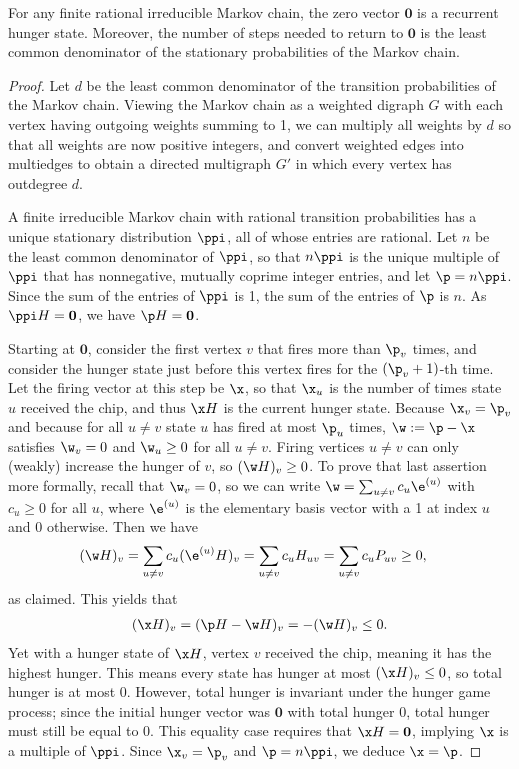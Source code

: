 \begin{proposition}\label{proposition: 0 hunger recurrent}
For any finite rational irreducible Markov chain, 
the zero vector $\mathbf{0}$ is a recurrent hunger state.
Moreover, the number of steps needed to return to $\mathbf{0}$ 
is the least common denominator of the stationary probabilities of the Markov chain.
\end{proposition}
\begin{proof}
Let $d$ be the least common denominator 
of the transition probabilities of the Markov chain.
Viewing the Markov chain as a weighted digraph $G$
with each vertex having outgoing weights summing to 1,
we can multiply all weights by $d$ so that all weights are now positive integers, 
and convert weighted edges into multiedges to obtain a directed multigraph $G'$
in which every vertex has outdegree $d$.

A finite irreducible Markov chain with rational transition probabilities
has a unique stationary distribution $\ppi$, all of whose entries are rational.
Let $n$ be the least common denominator of $\ppi$, so that $n\ppi$
is the unique multiple of $\ppi$ 
that has nonnegative, mutually coprime integer entries, and let $\p = n\ppi$.
Since the sum of the entries of $\ppi$ is 1, the sum of the entries of $\p$ is $n$. 
As $\ppi H=\mathbf{0}$, we have $\p H=\mathbf{0}$.

Starting at $\mathbf{0}$, consider the first vertex $v$ that fires more than $\p_v$ times, 
and consider the hunger state just before this vertex fires for the $(\p_v+1)$-th time.
Let the firing vector at this step be $\x$, so that $\x_u$ is the number of times 
state $u$ received the chip, and thus $\x H$ is the current hunger state.
Because $\x_v = \p_v$ and 
because for all $u \neq v$ state $u$ has fired at most $\p_u$ times, 
$\w := \p - \x$ satisfies $\w_v = 0$ and $\w_u \geq 0$ for all $u \neq v$.
Firing vertices $u\neq v$ can only (weakly) increase the hunger of $v$, 
so $(\w H)_v \geq 0$.
To prove that last assertion more formally, recall that $\w_v = 0$, 
so we can write $\w=\sum_{u \neq v} c_u \e^{(u)}$ with $c_u \geq 0$ for all $u$,
where $\e^{(u)}$ is the elementary basis vector with a 1 at index $u$ and 0 otherwise.
Then we have
\begin{align*}
    (\w H)_v
    &= \sum_{u \neq v} c_u (\e^{(u)} H)_v
    = \sum_{u \neq v} c_u H_{uv}
    = \sum_{u \neq v} c_u P_{uv}
    \geq 0,
\end{align*}
as claimed. This yields that 
\begin{align*}
    (\x H)_v
    = (\p H - \w H)_v
    = -(\w H)_v
    \leq 0.
\end{align*}
Yet with a hunger state of $\x H$, vertex $v$ received the chip, 
meaning it has the highest hunger.
This means every state has hunger at most $(\x H)_v \leq 0$, so total hunger is at most 0.
However, total hunger is invariant under the hunger game process;
since the initial hunger vector was $\mathbf{0}$ with total hunger 0, 
total hunger must still be equal to 0.
This equality case requires that $\x H = \mathbf{0}$, 
implying $\x$ is a multiple of $\ppi$. 
Since $\x_v = \p_v$ and $\p = n\ppi$, we deduce $\x = \p$.


\end{proof}
